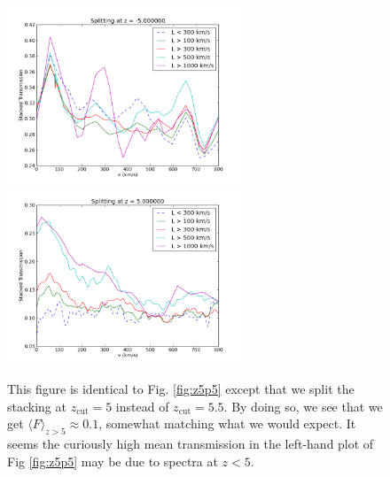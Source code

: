\documentclass[11pt]{article}
\begin{document}
\begin{figure}[h]
  \centering
  \includegraphics[width=7cm]{Stack_Zlessthan5.png}
  \includegraphics[width=7cm]{Stack_Zgreaterthan5.png}
  \caption{This figure is identical to Fig. \ref{fig:z5p5} except that we split the stacking at $z_{\text{cut}} = 5$ instead of $z_{\text{cut}} = 5.5$. By doing so, we see that we get $\langle F \rangle_{z>5} \approx 0.1$, somewhat matching what we would expect. It seems the curiously high mean transmission in the left-hand plot of Fig \ref{fig:z5p5} may be due to spectra at $z < 5$.}
  \label{fig:todo}
\end{figure}



\end{document}
